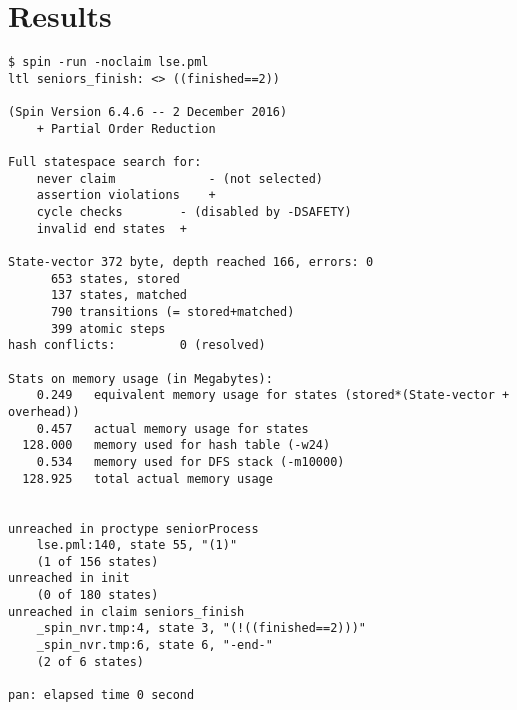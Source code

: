 \documentclass[a4paper]{scrartcl}
\begin{document}
\section{Results}
\begin{lstlisting}[float, caption = {\texttt{spin} output for correctness checking with \(\texttt{SENIORS} = 2\)}, label = lst:correctness]
$ spin -run -noclaim lse.pml
ltl seniors_finish: <> ((finished==2))

(Spin Version 6.4.6 -- 2 December 2016)
	+ Partial Order Reduction

Full statespace search for:
	never claim         	- (not selected)
	assertion violations	+
	cycle checks       	- (disabled by -DSAFETY)
	invalid end states	+

State-vector 372 byte, depth reached 166, errors: 0
      653 states, stored
      137 states, matched
      790 transitions (= stored+matched)
      399 atomic steps
hash conflicts:         0 (resolved)

Stats on memory usage (in Megabytes):
    0.249	equivalent memory usage for states (stored*(State-vector + overhead))
    0.457	actual memory usage for states
  128.000	memory used for hash table (-w24)
    0.534	memory used for DFS stack (-m10000)
  128.925	total actual memory usage


unreached in proctype seniorProcess
	lse.pml:140, state 55, "(1)"
	(1 of 156 states)
unreached in init
	(0 of 180 states)
unreached in claim seniors_finish
	_spin_nvr.tmp:4, state 3, "(!((finished==2)))"
	_spin_nvr.tmp:6, state 6, "-end-"
	(2 of 6 states)

pan: elapsed time 0 second
\end{lstlisting}
\end{document}
